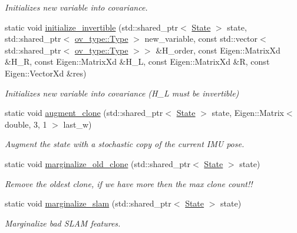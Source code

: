 \begin{DoxyCompactItemize}
\begin{DoxyCompactList}\small\item\em Initializes new variable into covariance. \end{DoxyCompactList}\item 
static void \hyperlink{classov__msckf_1_1StateHelper_adb0f34932bb91d89bfd5ae72c2e693d8}{initialize\+\_\+invertible} (std\+::shared\+\_\+ptr$<$ \hyperlink{classov__msckf_1_1State}{State} $>$ state, std\+::shared\+\_\+ptr$<$ \hyperlink{classov__type_1_1Type}{ov\+\_\+type\+::\+Type} $>$ new\+\_\+variable, const std\+::vector$<$ std\+::shared\+\_\+ptr$<$ \hyperlink{classov__type_1_1Type}{ov\+\_\+type\+::\+Type} $>$$>$ \&H\+\_\+order, const Eigen\+::\+Matrix\+Xd \&H\+\_\+R, const Eigen\+::\+Matrix\+Xd \&H\+\_\+L, const Eigen\+::\+Matrix\+Xd \&R, const Eigen\+::\+Vector\+Xd \&res)
\begin{DoxyCompactList}\small\item\em Initializes new variable into covariance (H\+\_\+L must be invertible) \end{DoxyCompactList}\item 
static void \hyperlink{classov__msckf_1_1StateHelper_ade3a86a89f15cc6e03a6430fd1dee694}{augment\+\_\+clone} (std\+::shared\+\_\+ptr$<$ \hyperlink{classov__msckf_1_1State}{State} $>$ state, Eigen\+::\+Matrix$<$ double, 3, 1 $>$ last\+\_\+w)
\begin{DoxyCompactList}\small\item\em Augment the state with a stochastic copy of the current I\+MU pose. \end{DoxyCompactList}\item 
static void \hyperlink{classov__msckf_1_1StateHelper_a18f86e6da0bf5e7d4879f8c2f1460a27}{marginalize\+\_\+old\+\_\+clone} (std\+::shared\+\_\+ptr$<$ \hyperlink{classov__msckf_1_1State}{State} $>$ state)
\begin{DoxyCompactList}\small\item\em Remove the oldest clone, if we have more then the max clone count!! \end{DoxyCompactList}\item 
static void \hyperlink{classov__msckf_1_1StateHelper_a54f8517a288b9362f29481f650f4b959}{marginalize\+\_\+slam} (std\+::shared\+\_\+ptr$<$ \hyperlink{classov__msckf_1_1State}{State} $>$ state)
\begin{DoxyCompactList}\small\item\em Marginalize bad S\+L\+AM features. \end{DoxyCompactList}\end{DoxyCompactItemize}


